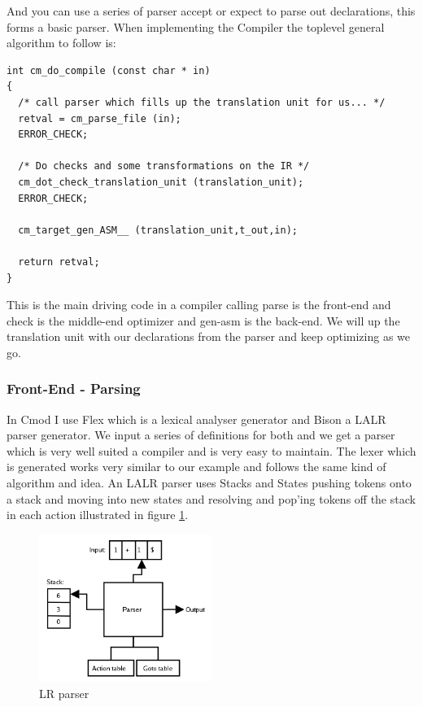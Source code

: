 \documentclass[defaultstyle,11pt]{article}
\begin{document}
And you can use a series of parser accept or expect to parse out declarations, this forms a basic parser. When
implementing the Compiler the toplevel general algorithm to follow is:

\begin{lstlisting}
int cm_do_compile (const char * in)
{
  /* call parser which fills up the translation unit for us... */
  retval = cm_parse_file (in);
  ERROR_CHECK;

  /* Do checks and some transformations on the IR */
  cm_dot_check_translation_unit (translation_unit);
  ERROR_CHECK;

  cm_target_gen_ASM__ (translation_unit,t_out,in);

  return retval;
}
\end{lstlisting}

This is the main driving code in a compiler calling parse is the front-end and check is the middle-end optimizer and gen-asm
is the back-end. We will up the translation unit with our declarations from the parser and keep optimizing as we go.

\subsubsection{Front-End - Parsing}
In Cmod I use Flex which is a lexical analyser generator and Bison a LALR parser generator. We input a series of definitions
for both and we get a parser which is very well suited a compiler and is very easy to maintain. The lexer which is generated
works very similar to our example and follows the same kind of algorithm and idea. An LALR parser uses Stacks and States
pushing tokens onto a stack and moving into new states and resolving and pop'ing tokens off the stack in each action illustrated
in figure \ref{fig:LR parser}.

\begin{figure}[h!]
  \caption{LR parser}
  \label{fig:LR parser}
  \centering
    \includegraphics[width=0.5\textwidth]{LR_Parser.png}
\end{figure}
\end{document}
